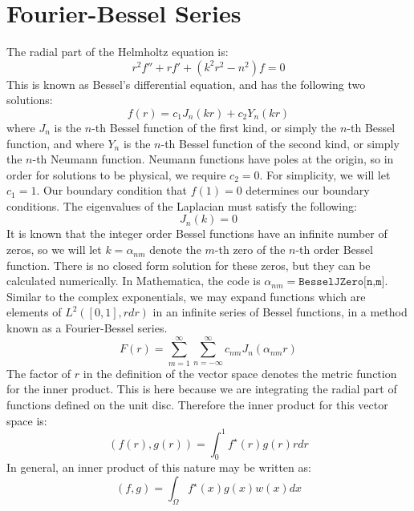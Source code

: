 \documentclass{article}
\begin{document}
\section{Fourier-Bessel Series}
The radial part of the Helmholtz equation is:
\begin{equation}
  r^2 f''+ rf' + (k^2 r^2 - n^2) f = 0
\end{equation}
This is known as Bessel's differential equation, and has the following two solutions:
\begin{equation}
  f(r) = c_1 J_n(k r) + c_2 Y_n (k r)
\end{equation}
where $J_n$ is the $n$-th Bessel function of the first kind, or simply the $n$-th Bessel function, and where $Y_n$ is the $n$-th Bessel function of the second kind, or simply the $n$-th Neumann function. Neumann functions have poles at the origin, so in order for solutions to be physical, we require $c_2 = 0$. For simplicity, we will let $c_1 = 1$. Our boundary condition that $f(1)= 0$ determines our boundary conditions. The eigenvalues of the Laplacian must satisfy the following:
\begin{equation}
  \boxed{
    J_n(k) = 0
  }
\end{equation}
It is known that the integer order Bessel functions have an infinite number of zeros, so we will let $k = \alpha_{nm}$ denote the $m$-th zero of the $n$-th order Bessel function. There is no closed form solution for these zeros, but they can be calculated numerically. In Mathematica, the code is $\alpha_{nm} = \texttt{BesselJZero[n,m]}$.\\
Similar to the complex exponentials, we may expand functions which are elements of $L^2([0,1],rdr)$ in an infinite series of Bessel functions, in a method known as a Fourier-Bessel series.
\begin{equation}
  F(r) = \sum_{m = 1}^{\infty} \sum_{n = -\infty}^\infty c_{nm} J_n(\alpha_{nm} r)
\end{equation}
The factor of $r$ in the definition of the vector space denotes the metric function for the inner product. This is here because we are integrating the radial part of functions defined on the unit disc. Therefore the inner product for this vector space is:
\begin{equation}
  (f(r),g(r)) = \int_0^1 f^\star(r)g(r)r dr
\end{equation}
In general, an inner product of this nature may be written as:
\begin{equation}
  (f,g) = \int_\Omega f^\star (x) g(x) w(x)dx
\end{equation}
\end{document}
